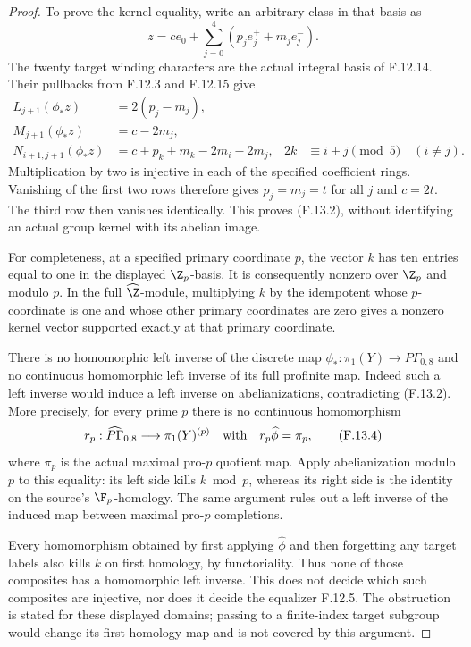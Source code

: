\begin{proof}
To prove the kernel equality, write an arbitrary class
in that basis as
\[
 z=c e_0+\sum_{j=0}^4(p_j e_j^++m_j e_j^-).
\]
The twenty target winding characters are the actual
integral basis of F.12.14.  Their pullbacks from
F.12.3 and F.12.15 give
\[
 \begin{aligned}
 L_{j+1}(\phi_*z)&=2(p_j-m_j),\\
 M_{j+1}(\phi_*z)&=c-2m_j,\\
 N_{i+1,j+1}(\phi_*z)
   &=c+p_k+m_k-2m_i-2m_j,
      &2k&\equiv i+j\pmod5\quad(i\ne j).
 \end{aligned}                                                \tag{F.13.3}
\]
Multiplication by two is injective in each of the
specified coefficient rings.  Vanishing of the first
two rows therefore gives $p_j=m_j=t$ for all $j$ and
$c=2t$.  The third row then vanishes identically.
This proves (F.13.2), without identifying an actual
group kernel with its abelian image.

For completeness, at a specified primary coordinate
$p$, the vector $k$ has ten entries equal to one in
the displayed $\Z_p$-basis.  It is consequently
nonzero over $\Z_p$ and modulo $p$.  In the full
$\widehat\Z$-module, multiplying $k$ by the idempotent
whose $p$-coordinate is one and whose other primary
coordinates are zero gives a nonzero kernel vector
supported exactly at that primary coordinate.

There is no homomorphic left inverse of the discrete
map $\phi_*:\pi_1(Y)\to P\Gamma_{0,8}$ and no continuous
homomorphic left inverse of its full profinite map.
Indeed such a left inverse would induce a left inverse
on abelianizations, contradicting (F.13.2).
More precisely, for every prime $p$ there is no
continuous homomorphism
\[
 r_p:\widehat{P\Gamma}_{0,8}
                  \longrightarrow\pi_1(Y)^{(p)}
 \quad\hbox{with}\quad
 r_p\widehat\phi=\pi_p,
                                                               \tag{F.13.4}
\]
where $\pi_p$ is the actual maximal pro-$p$ quotient
map.  Apply abelianization modulo $p$ to this equality:
its left side kills $k\bmod p$, whereas its right side
is the identity on the source's $\F_p$-homology.
The same argument rules out a left inverse of the
induced map between maximal pro-$p$ completions.

Every homomorphism obtained by first applying
$\widehat\phi$ and then forgetting any target labels
also kills $k$ on first homology, by functoriality.
Thus none of those composites has a homomorphic
left inverse.  This does not decide which such
composites are injective, nor does it decide the
equalizer F.12.5.  The obstruction is stated for
these displayed domains; passing to a finite-index
target subgroup would change its first-homology
map and is not covered by this argument.


\end{proof}
